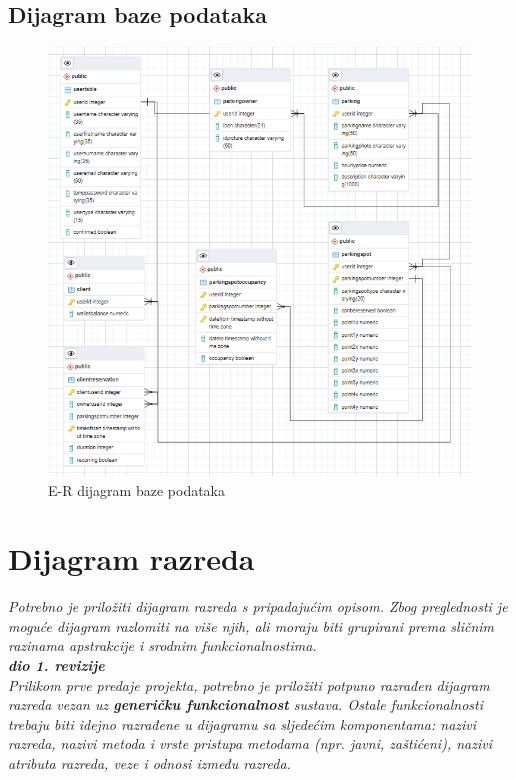 \subsection{Dijagram baze podataka}


\begin{figure}[H]
	
	\includegraphics[width=\textwidth]{slike/db.png} %
	\centering
	\caption{E-R dijagram baze podataka}
	\label{fig:dijagramBP}
\end{figure}

\eject



\section{Dijagram razreda}

\textit{Potrebno je priložiti dijagram razreda s pripadajućim opisom. Zbog preglednosti je moguće dijagram razlomiti na više njih, ali moraju biti grupirani prema sličnim razinama apstrakcije i srodnim funkcionalnostima.}\\

\textbf{\textit{dio 1. revizije}}\\

\textit{Prilikom prve predaje projekta, potrebno je priložiti potpuno razrađen dijagram razreda vezan uz \textbf{generičku funkcionalnost} sustava. Ostale funkcionalnosti trebaju biti idejno razrađene u dijagramu sa sljedećim komponentama: nazivi razreda, nazivi metoda i vrste pristupa metodama (npr. javni, zaštićeni), nazivi atributa razreda, veze i odnosi između razreda.}\\

